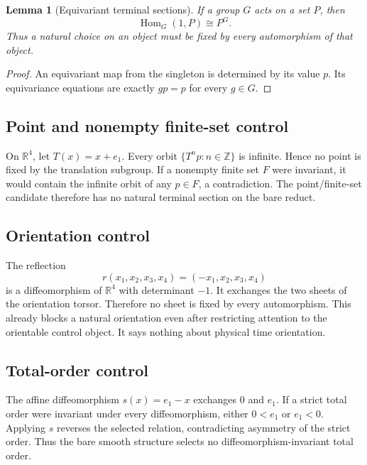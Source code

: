 \documentclass[11pt]{article}
\newtheorem{lemma}{Lemma}
\begin{document}
\begin{lemma}[Equivariant terminal sections]
If a group \(G\) acts on a set \(P\), then
\[
  \operatorname{Hom}_{G}(1,P)\cong P^{G}.
\]
Thus a natural choice on an object must be fixed by every automorphism of that
object.
\end{lemma}

\begin{proof}
An equivariant map from the singleton is determined by its value \(p\).  Its
equivariance equations are exactly \(g p=p\) for every \(g\in G\).
\end{proof}

\subsection{Point and nonempty finite-set control}

On \(\mathbb{R}^{4}\), let \(T(x)=x+e_{1}\).  Every orbit
\(\{T^{n}p:n\in\mathbb{Z}\}\) is infinite.  Hence no point is fixed by the
translation subgroup.  If a nonempty finite set \(F\) were invariant, it
would contain the infinite orbit of any \(p\in F\), a contradiction.  The
point/finite-set candidate therefore has no natural terminal section on the
bare reduct.

\subsection{Orientation control}

The reflection
\[
 r(x_{1},x_{2},x_{3},x_{4})=(-x_{1},x_{2},x_{3},x_{4})
\]
is a diffeomorphism of \(\mathbb{R}^{4}\) with determinant \(-1\).  It
exchanges the two sheets of the orientation torsor.  Therefore no sheet is
fixed by every automorphism.  This already blocks a natural orientation even
after restricting attention to the orientable control object.  It says
nothing about physical time orientation.

\subsection{Total-order control}

The affine diffeomorphism \(s(x)=e_{1}-x\) exchanges \(0\) and \(e_{1}\).
If a strict total order were invariant under every diffeomorphism, either
\(0<e_{1}\) or \(e_{1}<0\).  Applying \(s\) reverses the selected relation,
contradicting asymmetry of the strict order.  Thus the bare smooth structure
selects no diffeomorphism-invariant total order.
\end{document}
